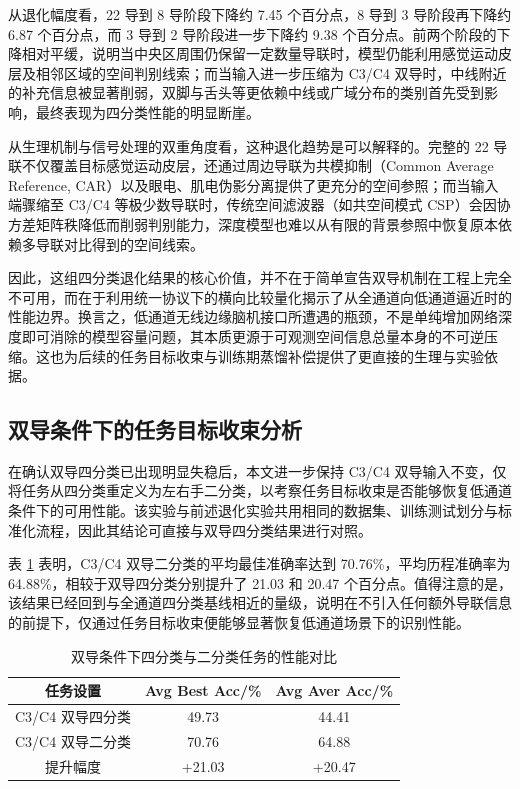 从退化幅度看，22 导到 8 导阶段下降约 7.45 个百分点，8 导到 3 导阶段再下降约 6.87 个百分点，而 3 导到 2 导阶段进一步下降约 9.38 个百分点。前两个阶段的下降相对平缓，说明当中央区周围仍保留一定数量导联时，模型仍能利用感觉运动皮层及相邻区域的空间判别线索；而当输入进一步压缩为 C3/C4 双导时，中线附近的补充信息被显著削弱，双脚与舌头等更依赖中线或广域分布的类别首先受到影响，最终表现为四分类性能的明显断崖。

从生理机制与信号处理的双重角度看，这种退化趋势是可以解释的。完整的 22 导联不仅覆盖目标感觉运动皮层，还通过周边导联为共模抑制（Common Average Reference, CAR）以及眼电、肌电伪影分离提供了更充分的空间参照；而当输入端骤缩至 C3/C4 等极少数导联时，传统空间滤波器（如共空间模式 CSP）会因协方差矩阵秩降低而削弱判别能力，深度模型也难以从有限的背景参照中恢复原本依赖多导联对比得到的空间线索。

因此，这组四分类退化结果的核心价值，并不在于简单宣告双导机制在工程上完全不可用，而在于利用统一协议下的横向比较量化揭示了从全通道向低通道逼近时的性能边界。换言之，低通道无线边缘脑机接口所遭遇的瓶颈，不是单纯增加网络深度即可消除的模型容量问题，其本质更源于可观测空间信息总量本身的不可逆压缩。这也为后续的任务目标收束与训练期蒸馏补偿提供了更直接的生理与实验依据。

\subsection{双导条件下的任务目标收束分析}
在确认双导四分类已出现明显失稳后，本文进一步保持 C3/C4 双导输入不变，仅将任务从四分类重定义为左右手二分类，以考察任务目标收束是否能够恢复低通道条件下的可用性能。该实验与前述退化实验共用相同的数据集、训练测试划分与标准化流程，因此其结论可直接与双导四分类结果进行对照。

表 \ref{tab:c3c4_task_redefine} 表明，C3/C4 双导二分类的平均最佳准确率达到 70.76\%，平均历程准确率为 64.88\%，相较于双导四分类分别提升了 21.03 和 20.47 个百分点。值得注意的是，该结果已经回到与全通道四分类基线相近的量级，说明在不引入任何额外导联信息的前提下，仅通过任务目标收束便能够显著恢复低通道场景下的识别性能。

\begin{table}[htbp]
    \centering
    \caption{双导条件下四分类与二分类任务的性能对比}
    \label{tab:c3c4_task_redefine}
    \begin{tabular}{ccc}
        \hline
        任务设置 & Avg Best Acc/\% & Avg Aver Acc/\% \\
        \hline
        C3/C4 双导四分类 & 49.73 & 44.41 \\
        C3/C4 双导二分类 & 70.76 & 64.88 \\
        提升幅度 & +21.03 & +20.47 \\
        \hline
    \end{tabular}
\end{table}

